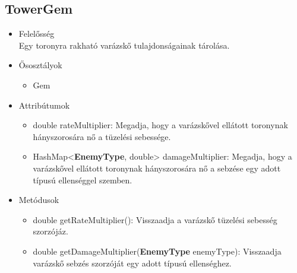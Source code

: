 \subsection{TowerGem}
\begin{itemize}
\item Felelősség\\
Egy toronyra rakható varázskő tulajdonságainak tárolása.
\item Ősosztályok
	\begin{itemize}
		\item Gem
	\end{itemize}
\item Attribútumok
	\begin{itemize}
		\item double rateMultiplier: Megadja, hogy a varázskővel ellátott toronynak hányszorosára nő a tüzelési sebessége.
		\item HashMap<\textbf{EnemyType}, double> damageMultiplier: Megadja, hogy a varázskővel ellátott toronynak hányszorosára nő a sebzése egy adott típusú ellenséggel szemben.
	\end{itemize}
\item Metódusok
	\begin{itemize}
		\item double getRateMultiplier(): Visszaadja a varázskő tüzelési sebesség szorzójáz.
		\item double getDamageMultiplier(\textbf{EnemyType} enemyType): Visszaadja varázskő sebzés szorzóját egy adott típusú ellenséghez.
	\end{itemize}
\end{itemize}


